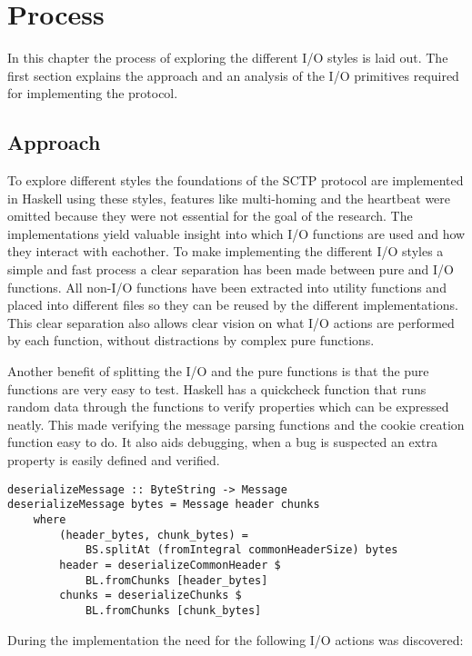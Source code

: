 \chapter{Process}
In this chapter the process of exploring the different I/O styles is laid out. The first section explains the approach and an analysis of the I/O primitives required for implementing the protocol.

\section{Approach}
To explore different styles the foundations of the SCTP protocol\cite{_rfc_????} are implemented in Haskell using these styles, features like multi-homing and the heartbeat were omitted because they were not essential for the goal of the research. The implementations yield valuable insight into which I/O functions are used and how they interact with eachother.
To make implementing the different I/O styles a simple and fast process a clear separation has been made between pure and I/O functions. All non-I/O functions have been extracted into utility functions and placed into different files so they can be reused by the different implementations. This clear separation also allows clear vision on what I/O actions are performed by each function, without distractions by complex pure functions.

Another benefit of splitting the I/O and the pure functions is that the pure functions are very easy to test. Haskell has a quickcheck\cite{Claessen_2000} function that runs random data through the functions to verify properties which can be expressed neatly. This made verifying the message parsing functions and the cookie creation function easy to do. It also aids debugging, when a bug is suspected an extra property is easily defined and verified.

\begin{lstlisting}[caption={An example of a shared pure function}, label={lst:shared}]
deserializeMessage :: ByteString -> Message
deserializeMessage bytes = Message header chunks
    where
        (header_bytes, chunk_bytes) =
            BS.splitAt (fromIntegral commonHeaderSize) bytes
        header = deserializeCommonHeader $
            BL.fromChunks [header_bytes]
        chunks = deserializeChunks $
            BL.fromChunks [chunk_bytes]
\end{lstlisting}

During the implementation the need for the following I/O actions was discovered:

